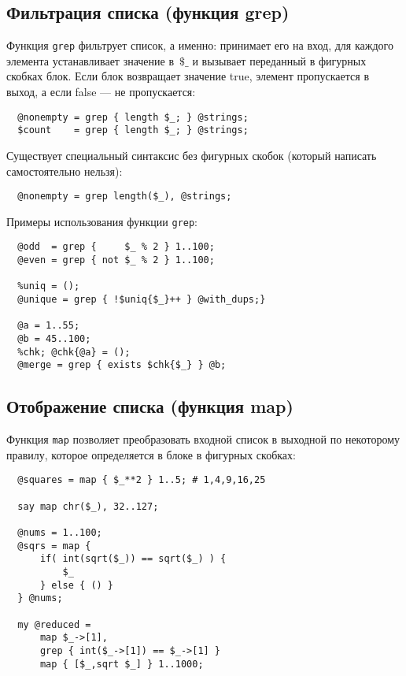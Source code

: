 \subsection{Фильтрация списка (функция grep)}
  Функция \verb|grep| фильтрует список, а именно: принимает его на вход, для каждого элемента устанавливает значение в~$\$\_$ и вызывает переданный в фигурных скобках блок. Если блок возвращает значение true, элемент пропускается в выход, а если false --- не пропускается:
  \begin{verbatim}
  @nonempty = grep { length $_; } @strings;
  $count    = grep { length $_; } @strings;
  \end{verbatim}
  Существует специальный синтаксис без фигурных скобок (который написать самостоятельно нельзя):
  \begin{verbatim}
  @nonempty = grep length($_), @strings;
  \end{verbatim}
  Примеры использования функции \verb|grep|:
  \begin{verbatim}
  @odd  = grep {     $_ % 2 } 1..100;
  @even = grep { not $_ % 2 } 1..100;

  %uniq = ();
  @unique = grep { !$uniq{$_}++ } @with_dups;}

  @a = 1..55;
  @b = 45..100;
  %chk; @chk{@a} = ();
  @merge = grep { exists $chk{$_} } @b;
  \end{verbatim}

\subsection{Отображение списка (функция map)}
  Функция \verb|map| позволяет преобразовать входной список в выходной по некоторому правилу, которое определяется в блоке в фигурных скобках:
  \begin{verbatim}
  @squares = map { $_**2 } 1..5; # 1,4,9,16,25

  say map chr($_), 32..127;

  @nums = 1..100;
  @sqrs = map {
      if( int(sqrt($_)) == sqrt($_) ) {
          $_
      } else { () }
  } @nums;

  my @reduced =
      map $_->[1],
      grep { int($_->[1]) == $_->[1] }
      map { [$_,sqrt $_] } 1..1000;
  \end{verbatim}

